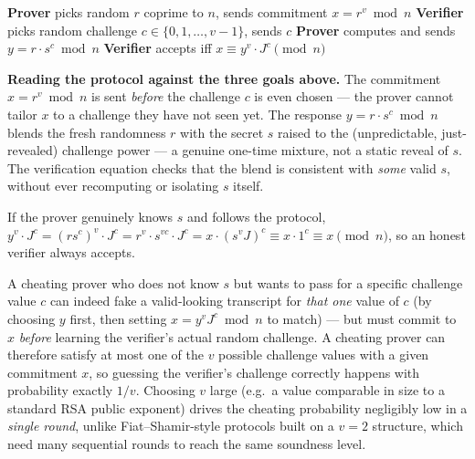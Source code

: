 \begin{algorithm}[h]
\caption{Guillou--Quisquater Identification Protocol (one round)}\label{alg:gq}
\begin{algorithmic}[1]
\State \textbf{Prover} picks random $r$ coprime to $n$, sends commitment $x = r^{v} \bmod n$
\State \textbf{Verifier} picks random challenge $c \in \{0, 1, \dots, v-1\}$, sends $c$
\State \textbf{Prover} computes and sends $y = r \cdot s^{c} \bmod n$
\State \textbf{Verifier} accepts iff $x \equiv y^{v} \cdot J^{c} \pmod n$
\end{algorithmic}
\end{algorithm}

\medskip\noindent\textbf{Reading the protocol against the three goals above.} The commitment $x=r^v\bmod n$ is sent \emph{before} the challenge $c$ is even chosen — the prover cannot tailor $x$ to a challenge they have not seen yet. The response $y=r\cdot s^c\bmod n$ blends the fresh randomness $r$ with the secret $s$ raised to the (unpredictable, just-revealed) challenge power — a genuine one-time mixture, not a static reveal of $s$. The verification equation checks that the blend is consistent with \emph{some} valid $s$, without ever recomputing or isolating $s$ itself.

\begin{proposition}[Completeness]
If the prover genuinely knows $s$ and follows the protocol, $y^v \cdot J^c = (r s^c)^v \cdot J^c = r^v \cdot s^{vc} \cdot J^c = x \cdot (s^v J)^c \equiv x \cdot 1^c \equiv x \pmod n$, so an honest verifier always accepts.
\end{proposition}

\begin{proposition}\label{prop:gq-soundness}
A cheating prover who does not know $s$ but wants to pass for a specific challenge value $c$ can indeed fake a valid-looking transcript for \emph{that one} value of $c$ (by choosing $y$ first, then setting $x = y^v J^c \bmod n$ to match) — but must commit to $x$ \emph{before} learning the verifier's actual random challenge. A cheating prover can therefore satisfy at most one of the $v$ possible challenge values with a given commitment $x$, so guessing the verifier's challenge correctly happens with probability exactly $1/v$. Choosing $v$ large (e.g.\ a value comparable in size to a standard RSA public exponent) drives the cheating probability negligibly low in a \emph{single round}, unlike Fiat--Shamir-style protocols built on a $v=2$ structure, which need many sequential rounds to reach the same soundness level.
\end{proposition}

